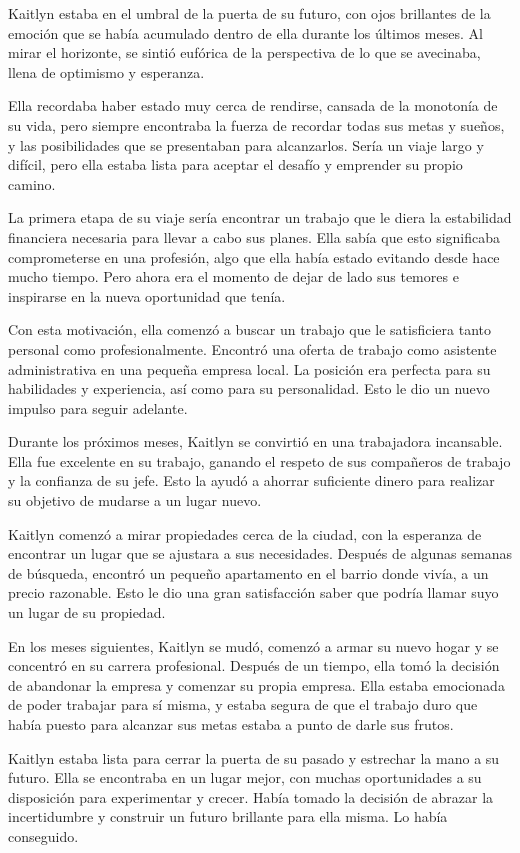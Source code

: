  Kaitlyn estaba en el umbral de la puerta de su futuro, con ojos brillantes de la emoción que se había acumulado dentro de ella durante los últimos meses. Al mirar el horizonte, se sintió eufórica de la perspectiva de lo que se avecinaba, llena de optimismo y esperanza.

Ella recordaba haber estado muy cerca de rendirse, cansada de la monotonía de su vida, pero siempre encontraba la fuerza de recordar todas sus metas y sueños, y las posibilidades que se presentaban para alcanzarlos. Sería un viaje largo y difícil, pero ella estaba lista para aceptar el desafío y emprender su propio camino.

La primera etapa de su viaje sería encontrar un trabajo que le diera la estabilidad financiera necesaria para llevar a cabo sus planes. Ella sabía que esto significaba comprometerse en una profesión, algo que ella había estado evitando desde hace mucho tiempo. Pero ahora era el momento de dejar de lado sus temores e inspirarse en la nueva oportunidad que tenía.

Con esta motivación, ella comenzó a buscar un trabajo que le satisficiera tanto personal como profesionalmente. Encontró una oferta de trabajo como asistente administrativa en una pequeña empresa local. La posición era perfecta para su habilidades y experiencia, así como para su personalidad. Esto le dio un nuevo impulso para seguir adelante.

Durante los próximos meses, Kaitlyn se convirtió en una trabajadora incansable. Ella fue excelente en su trabajo, ganando el respeto de sus compañeros de trabajo y la confianza de su jefe. Esto la ayudó a ahorrar suficiente dinero para realizar su objetivo de mudarse a un lugar nuevo.

Kaitlyn comenzó a mirar propiedades cerca de la ciudad, con la esperanza de encontrar un lugar que se ajustara a sus necesidades. Después de algunas semanas de búsqueda, encontró un pequeño apartamento en el barrio donde vivía, a un precio razonable. Esto le dio una gran satisfacción saber que podría llamar suyo un lugar de su propiedad.

En los meses siguientes, Kaitlyn se mudó, comenzó a armar su nuevo hogar y se concentró en su carrera profesional. Después de un tiempo, ella tomó la decisión de abandonar la empresa y comenzar su propia empresa. Ella estaba emocionada de poder trabajar para sí misma, y estaba segura de que el trabajo duro que había puesto para alcanzar sus metas estaba a punto de darle sus frutos.

Kaitlyn estaba lista para cerrar la puerta de su pasado y estrechar la mano a su futuro. Ella se encontraba en un lugar mejor, con muchas oportunidades a su disposición para experimentar y crecer. Había tomado la decisión de abrazar la incertidumbre y construir un futuro brillante para ella misma. Lo había conseguido.